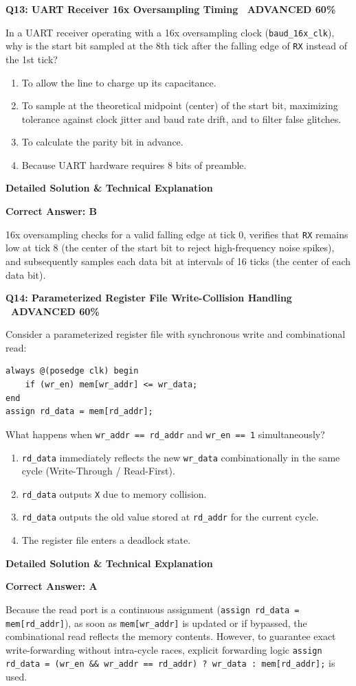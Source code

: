 \documentclass[11pt,a4paper]{article}
\newcommand{\badgeadv}{{\color{white}\colorbox{advred}{\bfseries\sffamily\tiny\ ADVANCED 60\%\ }}}
\newenvironment{qbox}[2]{%
  \begin{mdframed}[style=qstyle]%
  {\bfseries\sffamily\color{primaryblue}#1 \hfill #2}\par\vspace{2pt}%
}{%
  \end{mdframed}%
}
\newenvironment{ansbox}{%
  \begin{mdframed}[style=ansstyle]%
  {\bfseries\sffamily\color{ansgreen}\small Detailed Solution \& Technical Explanation}\par\vspace{2pt}\small%
}{%
  \end{mdframed}%
}
\begin{document}
\begin{qbox}{Q13: UART Receiver 16x Oversampling Timing}{\badgeadv}
In a UART receiver operating with a 16x oversampling clock (\texttt{baud\_16x\_clk}), why is the start bit sampled at the 8th tick after the falling edge of \texttt{RX} instead of the 1st tick?
\begin{enumerate}[label=\textbf{\Alph*.}]
  \item To allow the line to charge up its capacitance.
  \item To sample at the theoretical midpoint (center) of the start bit, maximizing tolerance against clock jitter and baud rate drift, and to filter false glitches.
  \item To calculate the parity bit in advance.
  \item Because UART hardware requires 8 bits of preamble.
\end{enumerate}
\end{qbox}
\begin{ansbox}
\textbf{Correct Answer: B}

16x oversampling checks for a valid falling edge at tick 0, verifies that \texttt{RX} remains low at tick 8 (the center of the start bit to reject high-frequency noise spikes), and subsequently samples each data bit at intervals of 16 ticks (the center of each data bit).
\end{ansbox}

\begin{qbox}{Q14: Parameterized Register File Write-Collision Handling}{\badgeadv}
Consider a parameterized register file with synchronous write and combinational read:
\begin{lstlisting}[style=verilogstyle]
always @(posedge clk) begin
    if (wr_en) mem[wr_addr] <= wr_data;
end
assign rd_data = mem[rd_addr];
\end{lstlisting}
What happens when \texttt{wr\_addr == rd\_addr} and \texttt{wr\_en == 1} simultaneously?
\begin{enumerate}[label=\textbf{\Alph*.}]
  \item \texttt{rd\_data} immediately reflects the new \texttt{wr\_data} combinationally in the same cycle (Write-Through / Read-First).
  \item \texttt{rd\_data} outputs \texttt{X} due to memory collision.
  \item \texttt{rd\_data} outputs the old value stored at \texttt{rd\_addr} for the current cycle.
  \item The register file enters a deadlock state.
\end{enumerate}
\end{qbox}
\begin{ansbox}
\textbf{Correct Answer: A}

Because the read port is a continuous assignment (\texttt{assign rd\_data = mem[rd\_addr]}), as soon as \texttt{mem[wr\_addr]} is updated or if bypassed, the combinational read reflects the memory contents. However, to guarantee exact write-forwarding without intra-cycle races, explicit forwarding logic \texttt{assign rd\_data = (wr\_en \&\& wr\_addr == rd\_addr) ? wr\_data : mem[rd\_addr];} is used.
\end{ansbox}
\end{document}
